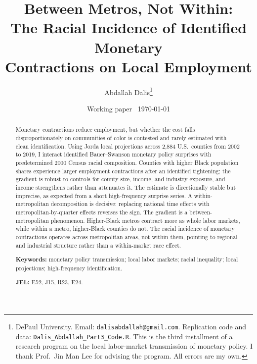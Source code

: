 \documentclass[11pt]{article}
\title{\bfseries Between Metros, Not Within:\\[2pt]
\large The Racial Incidence of Identified Monetary\\ Contractions on Local Employment}
\author{Abdallah Dalis\thanks{DePaul University. Email: \texttt{dalisabdallah@gmail.com}.
Replication code and data: \texttt{Dalis\_Abdallah\_Part3\_Code.R}. This is the third
installment of a research program on the local labor-market transmission of monetary
policy. I thank Prof.\ Jin Man Lee for advising the program. All errors are my own.}}
\date{Working paper \textperiodcentered\ \today}
\begin{document}
\maketitle
\thispagestyle{plain}


\begin{abstract}
\noindent Monetary contractions reduce employment, but whether the cost falls
disproportionately on communities of color is contested and rarely estimated with clean
identification. Using Jorda local projections across 2{,}884 U.S.\ counties from 2002 to
2019, I interact identified Bauer--Swanson monetary policy surprises with predetermined
2000 Census racial composition. Counties with higher Black population shares experience
larger employment contractions after an identified tightening; the gradient is robust to
controls for county size, income, and industry exposure, and income strengthens rather
than attenuates it. The estimate is directionally stable but imprecise, as expected from a
short high-frequency surprise series. A within-metropolitan decomposition is decisive:
replacing national time effects with metropolitan-by-quarter effects reverses the sign.
The gradient is a between-metropolitan phenomenon. Higher-Black metros contract more as
whole labor markets, while within a metro, higher-Black counties do not. The racial
incidence of monetary contractions operates across metropolitan areas, not within them,
pointing to regional and industrial structure rather than a within-market race effect.

\vspace{0.6em}
\noindent\textbf{Keywords:} monetary policy transmission; local labor markets; racial
inequality; local projections; high-frequency identification.

\noindent\textbf{JEL:} E52, J15, R23, E24.
\end{abstract}
\end{document}
